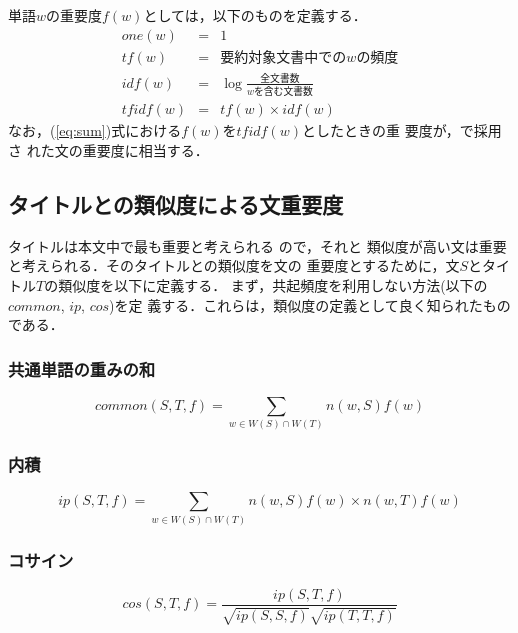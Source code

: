単語$w$の重要度$f(w)$としては，以下のものを定義する．
\begin{eqnarray}
  \label{eq:wimps1}
  one(w) & = & 1\\
  \label{eq:wimps2}
  tf(w) & = & \mbox{要約対象文書中での$w$の頻度}\\
  \label{eq:wimps3}
  idf(w) & = & \log \frac{\mbox{全文書数}}{\mbox{$w$を含む文書数}}\\
  \label{eq:wimps4}
  tfidf(w) & = & tf(w) \times idf(w)
\end{eqnarray}
なお，(\ref{eq:sum})式における$f(w)$を$tfidf(w)$としたときの重
要度が，\cite{zechner96:_fast_gener_abstr_gener_domain}で採用さ
れた文の重要度に相当する．

\subsection{タイトルとの類似度による文重要度}
\label{sec:sim}

タイトルは本文中で最も重要と考えられる
\cite{yoshimi98:_evaluat_impor_senten_connec_title}ので，それと
類似度が高い文は重要と考えられる．そのタイトルとの類似度を文の
重要度とするために，文$S$とタイトル$T$の類似度を以下に定義する．
まず，共起頻度を利用しない方法(以下の$common$, $ip$, $cos$)を定
義する．これらは，類似度の定義として良く知られたものである．

\subsubsection*{共通単語の重みの和}

\begin{equation}
  \label{eq:common}
  common(S,T,f)  =  \sum_{w \in W(S) \cap W(T)} n(w,S) f(w)
\end{equation}

\subsubsection*{内積}

\begin{equation}
  \label{eq:ip}
  ip(S,T,f)  =  \sum_{w \in W(S) \cap W(T)} n(w,S) f(w) \times n(w,T) f(w)
\end{equation}

\subsubsection*{コサイン}

\begin{equation}
  \label{eq:cos}
  cos(S,T,f) = \frac{ip(S,T,f)}{\sqrt{ip(S,S,f)}\sqrt{ip(T,T,f)}}
\end{equation}

